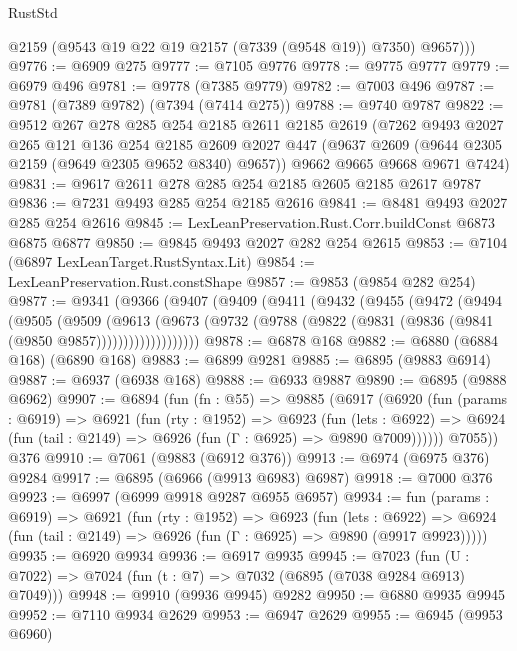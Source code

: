 \begin{lexlean}{RustStd}
\begin{coremodule}
          @2159
          (@9543 @19 @22 @19 @2157 (@7339 (@9548 @19)) @7350)
          @9657)))
@9776 := @6909 @275
@9777 := @7105 @9776
@9778 := @9775 @9777
@9779 := @6979 @496
@9781 := @9778 (@7385 @9779)
@9782 := @7003 @496
@9787 := @9781 (@7389 @9782) (@7394 (@7414 @275))
@9788 := @9740 @9787
@9822 := @9512
    @267
    @278
    @285
    @254
    @2185
    @2611
    @2185
    @2619
    (@7262
      @9493
      @2027
      @265
      @121
      @136
      @254
      @2185
      @2609
      @2027
      @447
      (@9637 @2609 (@9644 @2305 @2159 (@9649 @2305 @9652 @8340) @9657))
      @9662
      @9665
      @9668
      @9671
      @7424)
@9831 := @9617 @2611 @278 @285 @254 @2185 @2605 @2185 @2617 @9787
@9836 := @7231 @9493 @285 @254 @2185 @2616
@9841 := @8481 @9493 @2027 @285 @254 @2616
@9845 := LexLeanPreservation.Rust.Corr.buildConst @6873 @6875 @6877
@9850 := @9845 @9493 @2027 @282 @254 @2615
@9853 := @7104 (@6897 LexLeanTarget.RustSyntax.Lit)
@9854 := LexLeanPreservation.Rust.constShape
@9857 := @9853 (@9854 @282 @254)
@9877 := @9341
    (@9366
      (@9407
        (@9409
          (@9411
            (@9432
              (@9455
                (@9472
                  (@9494
                    (@9505
                      (@9509
                        (@9613
                          (@9673
                            (@9732
                              (@9788 (@9822 (@9831 (@9836 (@9841 (@9850 @9857)))))))))))))))))))
@9878 := @6878 @168
@9882 := @6880 (@6884 @168) (@6890 @168)
@9883 := @6899 @9281
@9885 := @6895 (@9883 @6914)
@9887 := @6937 (@6938 @168)
@9888 := @6933 @9887
@9890 := @6895 (@9888 @6962)
@9907 := @6894
    (fun (fn : @55) =>
    @9885
      (@6917
        (@6920
          (fun (params : @6919) =>
          @6921
            (fun (rty : @1952) =>
            @6923
              (fun (lets : @6922) =>
              @6924 (fun (tail : @2149) => @6926 (fun (Γ : @6925) => @9890 @7009))))))
        @7055))
    @376
@9910 := @7061 (@9883 (@6912 @376))
@9913 := @6974 (@6975 @376) @9284
@9917 := @6895 (@6966 (@9913 @6983) @6987)
@9918 := @7000 @376
@9923 := @6997 (@6999 @9918 @9287 @6955 @6957)
@9934 := fun (params : @6919) =>
  @6921
    (fun (rty : @1952) =>
    @6923
      (fun (lets : @6922) =>
      @6924 (fun (tail : @2149) => @6926 (fun (Γ : @6925) => @9890 (@9917 @9923)))))
@9935 := @6920 @9934
@9936 := @6917 @9935
@9945 := @7023 (fun (U : @7022) => @7024 (fun (t : @7) => @7032 (@6895 (@7038 @9284 @6913) @7049)))
@9948 := @9910 (@9936 @9945) @9282
@9950 := @6880 @9935 @9945
@9952 := @7110 @9934 @2629
@9953 := @6947 @2629
@9955 := @6945 (@9953 @6960)

\end{coremodule}
\end{lexlean}
